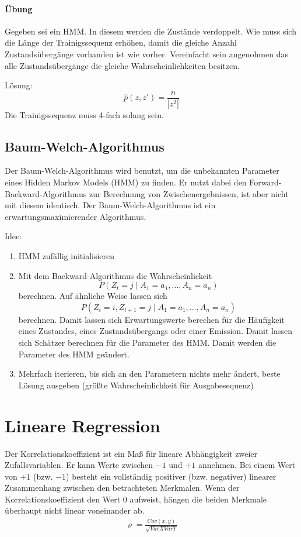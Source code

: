 \begin{shaded}
\paragraph{Übung}
\label{par:ubung2}

Gegeben sei ein HMM.
In diesem werden die Zustände verdoppelt.
Wie muss sich die Länge der Trainigssequenz erhöhen, damit die gleiche Anzahl Zustandsübergänge vorhanden ist wie vorher.
Vereinfacht sein angenohmen das alle Zustandsübergänge die gleiche Wahrscheinlichkeiten besitzen.

Lösung:
\[\hat p(z,z') = \frac{n}{|z^2|}\]
Die Trainigssequenz muss 4-fach solang sein.
\end{shaded}

\subsection{Baum-Welch-Algorithmus}
Der Baum-Welch-Algorithmus wird benutzt, um die unbekannten Parameter eines Hidden Markov Models (HMM) zu finden.
Er nutzt dabei den Forward-Backward-Algorithmus zur Berechnung von Zwischenergebnissen, ist aber nicht mit diesem identisch.
Der Baum-Welch-Algorithmus ist ein erwartungsmaximierender Algorithmus.

Idee:
\begin{enumerate}
    \item HMM zufällig initialisieren
    \item Mit dem Backward-Algorithmus die Wahrscheinlickeit \[P(Z_{t} = j \mid  A_{1} = a_{1}, \ldots, A_{n} = a_{n})\]berechnen.
        Auf ähnliche Weise lassen sich \[P(Z_{t} = i, Z_{t+1} = j \mid A_{1} = a_{1}, \ldots, A_{n} = a_{n})\] berechnen.
        Damit lassen sich Erwartungswerte berechen für die Häufigkeit eines Zustandes, eines Zustandsübergangs oder einer Emission.
        Damit lassen sich Schätzer berechnen für die Parameter des HMM.
        Damit werden die Parameter des HMM geändert.
    \item Mehrfach iterieren, bis sich an den Parametern nichts mehr ändert, beste Lösung ausgeben (größte Wahrscheinlichkeit für Ausgabesequenz)
\end{enumerate}

\section{Lineare Regression}
\label{sec:lineare_regression}
Der Korrelationskoeffizient ist ein Maß für lineare Abhängigkeit zweier Zufallsvariablen.
Er kann Werte zwischen \(−1\) und \(+1\) annehmen.
Bei einem Wert von \(+1\) (bzw. \(−1\)) besteht ein vollständig positiver (bzw. negativer) linearer Zusammenhang zwischen den betrachteten Merkmalen.
Wenn der Korrelationskoeffizient den Wert 0 aufweist, hängen die beiden Merkmale überhaupt nicht linear voneinander ab.
\begin{align*}
	\varrho = \frac{Cov(x,y)}{\sqrt{Var X Var Y}}
\end{align*}

